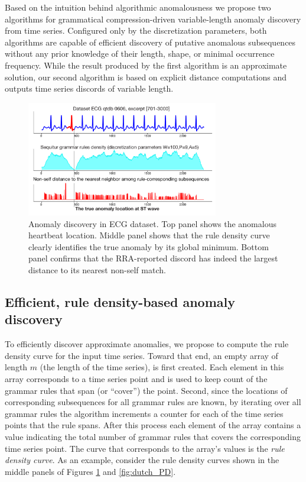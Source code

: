 \documentclass{sig-alternate}
\begin{document}
Based on the intuition behind algorithmic anomalousness we propose two algorithms for grammatical compression-driven variable-length anomaly discovery from time series. Configured only by the discretization parameters, both algorithms are capable of efficient discovery of putative anomalous subsequences without any prior knowledge of their length, shape, or minimal occurrence frequency. While the result produced by the first algorithm is an approximate solution, our second algorithm is based on explicit distance computations and outputs time series discords of variable length.

\begin{figure}[t]
  \centering
  \includegraphics[width=84mm]{Figure1_ECG0606.pdf}
  \caption{Anomaly discovery in ECG dataset. Top panel shows the anomalous heartbeat location. Middle panel shows that the rule density curve clearly identifies the true anomaly by its global minimum. Bottom panel confirms that the RRA-reported discord has indeed the largest distance to its nearest non-self match.}
  \label{fig:ecg}
\end{figure}

\subsection{Efficient, rule density-based anomaly\\ discovery}\label{density_curve}
To efficiently discover approximate anomalies, we propose to compute the rule density curve for the input time series. Toward that end, an empty array of length $m$ (the length of the time series), is first created. Each element in this array corresponds to a time series point and is used to keep count of the grammar rules that span (or ``cover'') the point. Second, since the locations of corresponding subsequences for all grammar rules are known, by iterating over all grammar rules the algorithm increments a counter for each of the time series points that the rule spans. After this process each element of the array contains a value indicating the total number of grammar rules that covers the corresponding time series point. The curve that corresponds to the array's values is the \textit{rule density curve}. As an example, consider the rule density curves shown in the middle panels of Figures \ref{fig:ecg} and \ref{fig:dutch_PD}.
\end{document}
